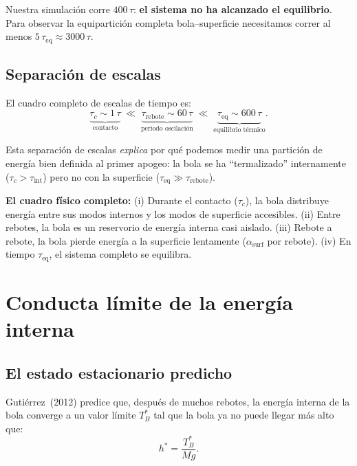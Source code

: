 \documentclass[11pt, a4paper]{article}
\begin{document}
Nuestra simulación corre $400\,\tau$: \textbf{el sistema no ha alcanzado el
equilibrio}. Para observar la equipartición completa bola--superficie
necesitamos correr al menos $5\,\tau_\text{eq} \approx 3000\,\tau$.

\subsection{Separación de escalas}

El cuadro completo de escalas de tiempo es:
\begin{equation}
  \underbrace{\tau_c \sim 1\,\tau}_{\text{contacto}}
  \;\ll\;
  \underbrace{\tau_\text{rebote} \sim 60\,\tau}_{\text{periodo oscilación}}
  \;\ll\;
  \underbrace{\tau_\text{eq} \sim 600\,\tau}_{\text{equilibrio térmico}}.
  \label{eq:escalas}
\end{equation}

Esta separación de escalas \emph{explica} por qué podemos medir una
partición de energía bien definida al primer apogeo: la bola se ha
``termalizado'' internamente ($\tau_c > \tau_\text{int}$) pero no con la
superficie ($\tau_\text{eq} \gg \tau_\text{rebote}$).

\begin{mdframed}[style=resultado]
\textbf{El cuadro físico completo:} (i) Durante el contacto ($\tau_c$),
la bola distribuye energía entre sus modos internos y los modos de
superficie accesibles. (ii) Entre rebotes, la bola es un reservorio de
energía interna casi aislado. (iii) Rebote a rebote, la bola pierde
energía a la superficie lentamente ($\alpha_\text{surf}$ por rebote).
(iv) En tiempo $\tau_\text{eq}$, el sistema completo se equilibra.
\end{mdframed}

\section{Conducta límite de la energía interna}

\subsection{El estado estacionario predicho}

Gutiérrez~(2012) predice que, después de muchos rebotes, la energía interna
de la bola converge a un valor límite $T_B^*$ tal que la bola ya no puede
llegar más alto que:
\begin{equation}
  h^* = \frac{T_B^*}{Mg}.
  \label{eq:h_star}
\end{equation}
\end{document}
